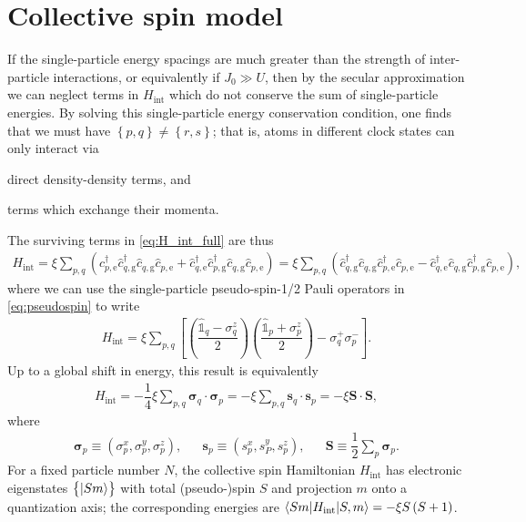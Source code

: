 \documentclass[aps,notitlepage,nofootinbib,11pt]{revtex4-1}
\renewcommand{\t}{\text} %
\newcommand{\f}[2]{\dfrac{#1}{#2}} %
\newcommand{\p}[1]{\left(#1\right)} %
\renewcommand{\sp}[1]{\left[#1\right]} %
\renewcommand{\set}[1]{\left\{#1\right\}} %
\renewcommand{\v}{\bm} %
\renewcommand{\c}{\cdot} %
\newcommand{\bk}{\braket} %
\newcommand{\g}{\text{g}} %
\newcommand{\e}{\text{e}}
\newcommand{\1}{\hat{\mathds{1}}}
\begin{document}
\section{Collective spin model}

If the single-particle energy spacings are much greater than the
strength of inter-particle interactions, or equivalently if
$J_0\gg U$, then by the secular approximation we can neglect terms in
$H_{\t{int}}$ which do not conserve the sum of single-particle
energies.  By solving this single-particle energy conservation
condition, one finds that we must have $\set{p,q}\ne\set{r,s}$; that
is, atoms in different clock states can only interact via
\begin{enumerate*}[label=(\roman*)]
\item direct density-density terms, and
\item terms which exchange their momenta.
\end{enumerate*}
The surviving terms in \eqref{eq:H_int_full} are thus
\begin{align}
  H_{\t{int}}
  = \xi \sum_{p,q}
  \p{\hat c_{p,\e}^\dag \hat c_{q,\g}^\dag \hat c_{q,\g} \hat c_{p,\e}
    + \hat c_{q,\e}^\dag \hat c_{p,\g}^\dag \hat c_{q,\g} \hat c_{p,\e}}
  = \xi \sum_{p,q}
  \p{\hat c_{q,\g}^\dag \hat c_{q,\g} \hat c_{p,\e}^\dag \hat c_{p,\e}
    - \hat c_{q,\e}^\dag \hat c_{q,\g} \hat c_{p,\g}^\dag \hat c_{p,\e}},
\end{align}
where we can use the single-particle pseudo-spin-1/2 Pauli operators
in \eqref{eq:pseudospin} to write
\begin{align}
  H_{\t{int}} = \xi \sum_{p,q}
  \sp{\p{\f{\1_q-\sigma_q^z}{2}} \p{\f{\1_p+\sigma_p^z}{2}}
    - \sigma_q^+ \sigma_p^-}.
\end{align}
Up to a global shift in energy, this result is equivalently
\begin{align}
  H_{\t{int}}
  = - \f14 \xi \sum_{p,q} \v{\sigma}_q\c\v{\sigma}_p
  = - \xi \sum_{p,q} \v s_q \c\v s_p
  = - \xi \v S \c \v S,
\end{align}
where
\begin{align}
  \v{\sigma}_p
  \equiv \p{\sigma_p^x,\sigma_p^y,\sigma_p^z},
  &&
  \v s_p \equiv \p{s_p^x,s_P^y,s_p^z},
  &&
  \v S \equiv \f12 \sum_p \v{\sigma}_p.
  \label{eq:H_int}
\end{align}
For a fixed particle number $N$, the collective spin Hamiltonian
$H_{\t{int}}$ has electronic eigenstates $\set{\ket{Sm}}$ with total
(pseudo-)spin $S$ and projection $m$ onto a quantization axis; the
corresponding energies are $\bk{Sm|H_{\t{int}}|S,m}=-\xi S\p{S+1}$.
\end{document}
